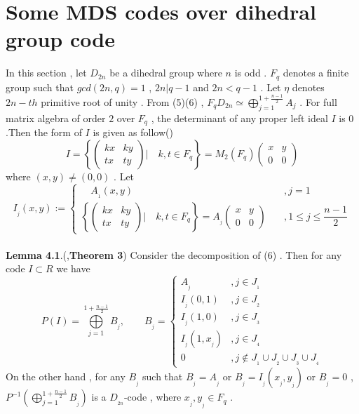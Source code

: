 \documentclass{article}
\begin{document}
\section{Some MDS codes over dihedral group code}
In this section , let $D_{2n}$ be a dihedral group where $n$ is odd . $F_q$ denotes a finite group such that $gcd(2n,q)=1$ , $2n|q-1$ and $2n<q-1$ . Let $\eta$ denotes $2n-th$ primitive root of unity . From (5)(6) , $F_qD_{2n}\simeq\mathop{\bigoplus}\limits_{j=1}^{1+\frac{n-1}{2}}A_j$ . For full matrix algebra of order $2$ over $F_q$ , the determinant of any proper left ideal $I$ is $0$ .Then the form of $I$ is given as follow(\cite{bib2})
\begin{equation}
    I=\left\{\begin{pmatrix}
           kx&ky\\
           tx&ty
      \end{pmatrix}{\Bigg|}
      \quad k,t\in{F_q} \right\}
      =M_2(F_q)\begin{pmatrix}
    x&y\\
    0&0
\end{pmatrix}
\end{equation}
where $(x,y)\neq(0,0)$ . Let
\[
I_{_j}(x,y):=\begin{cases}
  \quad {A_{_1}(x,y)}\quad&,j=1\\
  \left\{\begin{pmatrix}
           kx&ky\\
           tx&ty
      \end{pmatrix}{\Bigg|}
      \quad k,t\in{F_q} \right\}
       =A_{_j}\begin{pmatrix}
    x&y\\
    0&0
\end{pmatrix}
      \quad&,1\leq j\leq\dfrac{n-1}{2}
\end{cases}
\]
\\
\textbf{Lemma 4.1}.(\cite{bib2},\textbf{Theorem 3}) Consider the decomposition of (6) . Then for any code $I\subset R$ we have
\[
P(I)=\bigoplus\limits_{j=1}^{1+\frac{n-1}{2}}B_{_j},\qquad 
    B_{_j}=\begin{cases}
    A_{_j}&,j\in{J_{_1}}\\
    I_{_j}(0,1)&,j\in{J_{_2}}\\
    I_{_j}(1,0)&,j\in{J_{_3}}\\
    I_{_j}(1,x_{_j})&,j\in{J_{_4}}\\
    0&,j\notin {J_{_1}}\cup{J_{_2}}\cup{J_{_3}}\cup{J_{_4}}
\end{cases}
\]
On the other hand , for any $B_{_j}$ such that $B_{_j}=A_{_j}$ or $B_{_j}=I_{_j}(x_{_j},y_{_j})$ or $B_{_j}=0$ , $P^{\scriptscriptstyle-1}(\bigoplus\limits_{j=1}^{1+\frac{n-1}{2}}B_{_j})$ is a $D_{_{2n}}$-code , where $x_{_j},y_{_j}\in{F_q}$ .
\end{document}
